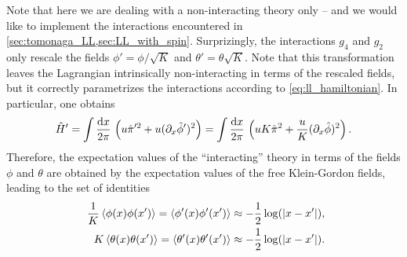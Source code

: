 Note that here we are dealing with a non-interacting theory only -- and we would like to implement the interactions encountered in \cref{sec:tomonaga_LL,sec:LL_with_spin}.
Surprizingly, the interactions $g_4$ and $g_2$ only rescale the fields $\phi'=\phi/\sqrt K$ and $\theta'=\theta\sqrt K$.
Note that this transformation leaves the Lagrangian intrinsically non-interacting in terms of the rescaled fields, but it correctly parametrizes the interactions according to \cref{eq:ll_hamiltonian}.
In particular, one obtains
\begin{align}
    \hat H' = \int\frac{\mathrm d x}{2\pi}\, \left( u\hat\pi'^2 + u(\partial_x\hat\phi')^2 \right) = \int\frac{\mathrm d x}{2\pi}\, \left( uK\hat\pi^2 + \frac uK(\partial_x\hat\phi)^2 \right).
\end{align}
Therefore, the expectation values of the ``interacting'' theory in terms of the fields $\phi$ and $\theta$ are obtained by the expectation values of the free Klein-Gordon fields, leading to the set of identities
\begin{align}
    \frac1K\braket{\phi(x)\phi(x')} = \braket{\phi'(x)\phi'(x')} \approx -\frac12\log(|x-x'|),\\
    \quad
    K\braket{\theta(x)\theta(x')} = \braket{\theta'(x)\theta'(x')} \approx -\frac12\log(|x-x'|).
\end{align}
%
%
